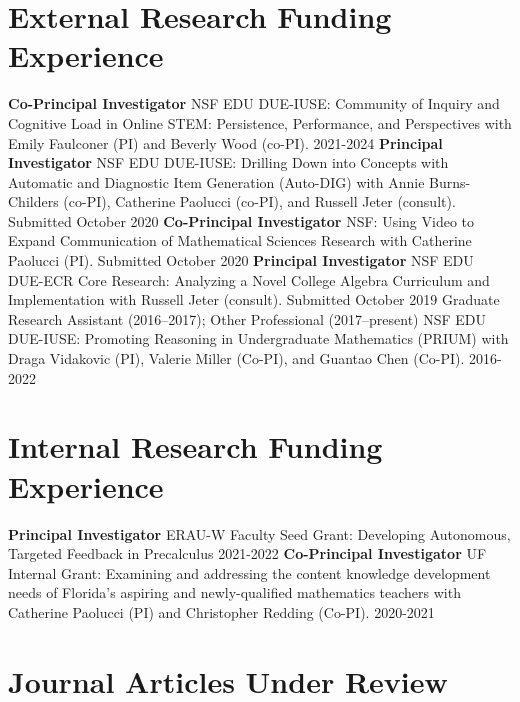 \documentclass[10pt,a4paper,sans]{moderncv}
\newcounter{peerReviewedArticleCounter}
\newcommand{\peerReviewedArticle}[1]{%
	\stepcounter{peerReviewedArticleCounter}
	\cvitem{[\arabic{peerReviewedArticleCounter}]}{%
		#1
	}
}
\begin{document}
\section{External Research Funding Experience}
	{\textbf{Co-Principal Investigator}}
	{NSF EDU DUE-IUSE: Community of Inquiry and Cognitive Load in Online STEM: Persistence, Performance, and Perspectives}
	{with Emily Faulconer (PI) and Beverly Wood (co-PI). 2021-2024}
	{}{}
	{\textbf{Principal Investigator}}
	{NSF EDU DUE-IUSE: Drilling Down into Concepts with Automatic and Diagnostic Item Generation (Auto-DIG)}
	{with Annie Burns-Childers (co-PI), Catherine Paolucci (co-PI), and Russell Jeter (consult). Submitted October 2020}
	{}{}
	{\textbf{Co-Principal Investigator}}
	{NSF: Using Video to Expand Communication of Mathematical Sciences Research}
	{with Catherine Paolucci (PI). Submitted October 2020}
	{}{}
	{\textbf{Principal Investigator}}
	{NSF EDU DUE-ECR Core Research: Analyzing a Novel College Algebra Curriculum and Implementation}
	{with Russell Jeter (consult). Submitted October 2019}
	{}{}
	{Graduate Research Assistant (2016--2017); Other Professional (2017--present)}
	{NSF EDU DUE-IUSE: Promoting Reasoning in Undergraduate Mathematics (PRIUM)}
	{with Draga Vidakovic (PI), Valerie Miller (Co-PI), and Guantao Chen (Co-PI). 2016-2022}
	{}{}
\section{Internal Research Funding Experience}
	{\textbf{Principal Investigator}}
	{ERAU-W Faculty Seed Grant: Developing Autonomous, Targeted Feedback in Precalculus}
	{2021-2022}
	{}{}
	{\textbf{Co-Principal Investigator}}
	{UF Internal Grant: Examining and addressing the content knowledge development needs of Florida's aspiring and newly-qualified mathematics teachers}
	{with Catherine Paolucci (PI) and Christopher Redding (Co-PI). 2020-2021}
	{}{}

\section{Journal Articles Under Review}
\end{document}
